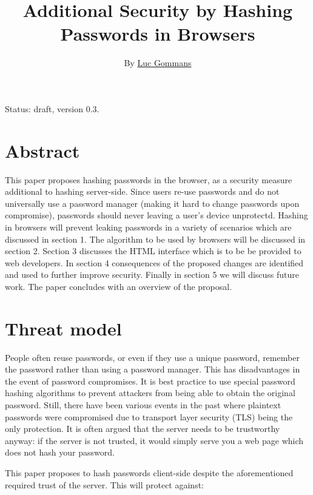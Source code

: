 \documentclass{paper}
\begin{document}
\title{Additional Security by Hashing Passwords in Browsers}
\author{By \href{https://lgms.nl}{Luc Gommans}}

\maketitle

Status: draft, version 0.3.

\section*{Abstract}

This paper proposes hashing passwords in the browser, as a security measure additional to
hashing server-side. Since users re-use passwords and do not universally use a password
manager (making it hard to change passwords upon compromise), passwords should never leaving
a user's device unprotectd. Hashing in browsers will prevent leaking passwords in a variety
of scenarios which are discussed in section 1. The algorithm to be used by browsers will be
discussed in section 2. Section 3 discusses the HTML interface which is to be be provided to
web developers. In section 4 consequences of the proposed changes are identified and used to
further improve security. Finally in section 5 we will discuss future work. The paper
concludes with an overview of the proposal.

\section{Threat model}

People often reuse passwords, or even if they use a unique password, remember the password
rather than using a password manager. This has disadvantages in the event of password
compromises. It is best practice to use special password hashing algorithms to prevent
attackers from being able to obtain the original password. Still, there have been various
events in the past where plaintext passwords were compromised due to transport layer security
(TLS) being the only protection. It is often argued that the server needs to be trustworthy
anyway: if the server is not trusted, it would simply serve you a web page which does not
hash your password.

This paper proposes to hash passwords client-side despite the aforementioned required trust
of the server. This will protect against:
\end{document}
